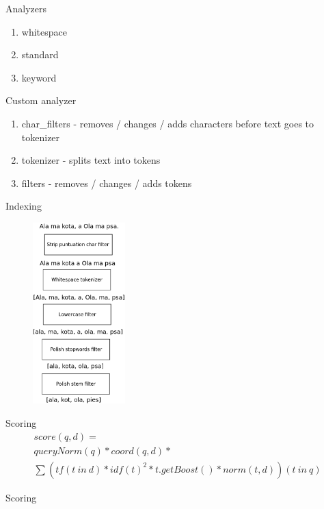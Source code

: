 \documentclass{beamer}
\begin{document}
\begin{frame}{Analyzers}
	\begin{enumerate}
		\item whitespace
		\item standard
		\item keyword
	\end{enumerate}
\end{frame}{
\begin{frame}{Custom analyzer}
	\begin{enumerate}
		\item char\_filters - removes / changes / adds characters before text goes to tokenizer
		\item tokenizer - splits text into tokens
		\item filters - removes / changes / adds tokens
	\end{enumerate}
\end{frame}{
\begin{frame}{Indexing}
	\begin{figure}
		\includegraphics[width=\textwidth,height=7cm,keepaspectratio=true]{analyzer}
	\end{figure}
\end{frame}
\begin{frame}{Scoring}
	\begin{equation*}
	\begin{multlined}
score(q,d) = \\
	queryNorm(q) * coord(q,d) * \\
	\sum(tf(t\ in\  d) *  idf(t)^2 * t.getBoost() *  norm(t,d)) (t\ in\ q)    
	\end{multlined}
	\end{equation*}
\end{frame}
\begin{frame}{Scoring}
	\begin{enumerate}

\end{enumerate}
\end{frame}}}
\end{document}
